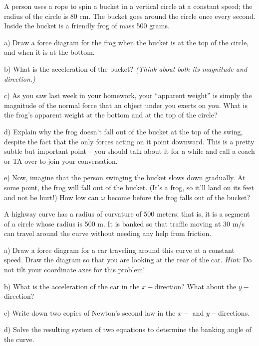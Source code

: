 \documentclass[12pt]{article}
\begin{document}
\Large
\centerline{}
\normalsize
\centerline{}


A person uses a rope to spin a bucket in a vertical circle at a constant speed; the radius of the circle is 80 cm. The bucket goes around the circle once every second. Inside the bucket is a friendly frog of mass 500 grams. 


a) Draw a force diagram for the frog when the bucket is at the top of the circle, and when it is at the bottom.

\vspace{2in}

b) What is the acceleration of the bucket? {\it (Think about both its magnitude and direction.)}

\vspace{1in}


c) As you saw last week in your homework, your ``apparent weight'' is simply the magnitude of the normal force that an object under you exerts on you. What is the frog's apparent weight at the bottom and at the top of the circle?

\vspace{2in}
\newpage
d) Explain why the frog doesn't fall out of the bucket at the top of the swing, despite the fact that the only forces acting on it point downward. This is a pretty subtle but important point -- you should talk about it for a while and call a coach or TA over to join your conversation.

\vspace{4in}

e) Now, imagine that the person swinging the bucket slows down gradually. At some point, the frog will fall out of the bucket. (It's a frog, so it'll land on its feet and not be hurt!) How low can $\omega$ become before the frog falls out of the bucket?

\newpage


A highway curve has a radius of curvature of 500 meters; that is, it is a segment of a circle whose radius is 500 m. It is banked so that traffic moving at 30 m/s can travel
around the curve without needing any help from friction.


a) Draw a force diagram for a car traveling around this curve at a constant speed. Draw the diagram so that you are looking at the rear of the car. {\it Hint:} Do not tilt your coordinate axes for this problem!


\vspace{2in}

b) What is the acceleration of the car in the $x-$direction? What about the $y-$direction?

\vspace{1in}

c) Write down two copies of Newton's second law in the $x-$ and $y-$directions.

\vspace{1.5in}

d) Solve the resulting system of two equations to determine the banking angle of the curve.
\end{document}
